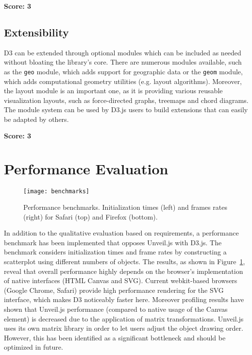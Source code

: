 \SuperPar \textbf{Score: 3}

\subsection{Extensibility}

D3 can be extended through optional modules which can be included as needed without bloating the library's core. There are numerous modules available, such as the \texttt{geo} module, which adds support for geographic data or the \texttt{geom} module, which adds computational geometry utilities (e.g. layout algorithms). Moreover, the layout module is an important one, as it is providing various reusable visualization layouts, such as force-directed graphs, treemaps and chord diagrams. The module system can be used by D3.js users to build extensions that can easily be adapted by others.

\SuperPar \textbf{Score: 3}


\section{Performance Evaluation}

\begin{figure}
\centering
\texttt{[image: benchmarks]}
\caption{Performance benchmarks. Initialization times (left) and frames rates (right) for Safari (top) and Firefox (bottom).}
\label{fig:benchmarks}
\end{figure}

In addition to the qualitative evaluation based on requirements, a performance benchmark has been implemented that opposes Unveil.js with D3.js. 
The benchmark considers initialization times and frame rates by constructing a scatterplot using different numbers of objects. The results, as shown in Figure~\ref{fig:benchmarks}, reveal that overall performance highly depends on the browser's implementation of native interfaces (HTML Canvas and SVG). Current webkit-based browsers (Google Chrome, Safari) provide high performance rendering for the SVG interface, which makes D3 noticeably faster here. Moreover profiling results have shown that Unveil.js performance (compared to native usage of the Canvas element) is decreased due to the application of matrix transformations. Unveil.js uses its own matrix library in order to let users adjust the object drawing order. However, this has been identified as a significant bottleneck and should be optimized in future.

